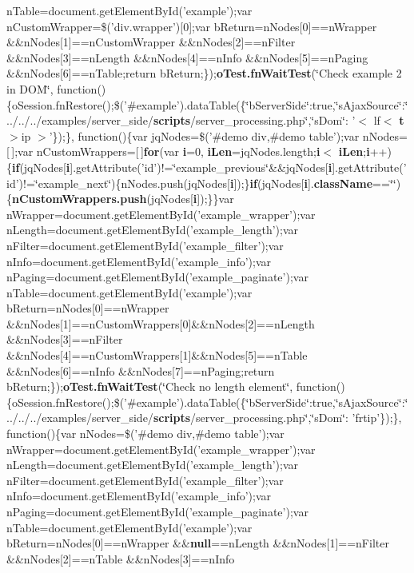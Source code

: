 {{\begin{DoxyParamCaption}
n\+Table=document.\+get\+Element\+By\+Id('example');var n\+Custom\+Wrapper=\$('div.\+wrapper')\mbox{[}0\mbox{]};var b\+Return=n\+Nodes\mbox{[}0\mbox{]}==n\+Wrapper \&\&n\+Nodes\mbox{[}1\mbox{]}==n\+Custom\+Wrapper \&\&n\+Nodes\mbox{[}2\mbox{]}==n\+Filter \&\&n\+Nodes\mbox{[}3\mbox{]}==n\+Length \&\&n\+Nodes\mbox{[}4\mbox{]}==n\+Info \&\&n\+Nodes\mbox{[}5\mbox{]}==n\+Paging \&\&n\+Nodes\mbox{[}6\mbox{]}==n\+Table;return b\+Return;\});{\bf o\+Test.\+fn\+Wait\+Test}(\char`\"{}Check example 2 in D\+O\+M\char`\"{}, function()\{o\+Session.\+fn\+Restore();\$('\#example').data\+Table(\{\char`\"{}b\+Server\+Side\char`\"{}\+:true,\char`\"{}s\+Ajax\+Source\char`\"{}\+:\char`\"{}../../../examples/server\+\_\+side/{\bf scripts}/server\+\_\+processing.\+php\char`\"{},\char`\"{}s\+Dom\char`\"{}\+: '$<$ lf$<$ {\bf t} $>$ip $>$'\});\}, function()\{var jq\+Nodes=\$('\#demo div,\#demo table');var n\+Nodes=\mbox{[}$\,$\mbox{]};var n\+Custom\+Wrappers=\mbox{[}$\,$\mbox{]}{\bf for}(var {\bf i}=0, {\bf i\+Len}=jq\+Nodes.\+length;{\bf i}$<$ {\bf i\+Len};{\bf i}++)\{{\bf if}(jq\+Nodes\mbox{[}{\bf i}\mbox{]}.get\+Attribute('id')!=\char`\"{}example\+\_\+previous\char`\"{}\&\&jq\+Nodes\mbox{[}{\bf i}\mbox{]}.get\+Attribute('id')!=\char`\"{}example\+\_\+next\char`\"{})\{n\+Nodes.\+push(jq\+Nodes\mbox{[}{\bf i}\mbox{]});\}{\bf if}(jq\+Nodes\mbox{[}{\bf i}\mbox{]}.{\bf class\+Name}==\char`\"{}\char`\"{})\{{\bf n\+Custom\+Wrappers.\+push}(jq\+Nodes\mbox{[}{\bf i}\mbox{]});\}\}var n\+Wrapper=document.\+get\+Element\+By\+Id('example\+\_\+wrapper');var n\+Length=document.\+get\+Element\+By\+Id('example\+\_\+length');var n\+Filter=document.\+get\+Element\+By\+Id('example\+\_\+filter');var n\+Info=document.\+get\+Element\+By\+Id('example\+\_\+info');var n\+Paging=document.\+get\+Element\+By\+Id('example\+\_\+paginate');var n\+Table=document.\+get\+Element\+By\+Id('example');var b\+Return=n\+Nodes\mbox{[}0\mbox{]}==n\+Wrapper \&\&n\+Nodes\mbox{[}1\mbox{]}==n\+Custom\+Wrappers\mbox{[}0\mbox{]}\&\&n\+Nodes\mbox{[}2\mbox{]}==n\+Length \&\&n\+Nodes\mbox{[}3\mbox{]}==n\+Filter \&\&n\+Nodes\mbox{[}4\mbox{]}==n\+Custom\+Wrappers\mbox{[}1\mbox{]}\&\&n\+Nodes\mbox{[}5\mbox{]}==n\+Table \&\&n\+Nodes\mbox{[}6\mbox{]}==n\+Info \&\&n\+Nodes\mbox{[}7\mbox{]}==n\+Paging;return b\+Return;\});{\bf o\+Test.\+fn\+Wait\+Test}(\char`\"{}Check no length element\char`\"{}, function()\{o\+Session.\+fn\+Restore();\$('\#example').data\+Table(\{\char`\"{}b\+Server\+Side\char`\"{}\+:true,\char`\"{}s\+Ajax\+Source\char`\"{}\+:\char`\"{}../../../examples/server\+\_\+side/{\bf scripts}/server\+\_\+processing.\+php\char`\"{},\char`\"{}s\+Dom\char`\"{}\+: 'frtip'\});\}, function()\{var n\+Nodes=\$('\#demo div,\#demo table');var n\+Wrapper=document.\+get\+Element\+By\+Id('example\+\_\+wrapper');var n\+Length=document.\+get\+Element\+By\+Id('example\+\_\+length');var n\+Filter=document.\+get\+Element\+By\+Id('example\+\_\+filter');var n\+Info=document.\+get\+Element\+By\+Id('example\+\_\+info');var n\+Paging=document.\+get\+Element\+By\+Id('example\+\_\+paginate');var n\+Table=document.\+get\+Element\+By\+Id('example');var b\+Return=n\+Nodes\mbox{[}0\mbox{]}==n\+Wrapper \&\&{\bf null}==n\+Length \&\&n\+Nodes\mbox{[}1\mbox{]}==n\+Filter \&\&n\+Nodes\mbox{[}2\mbox{]}==n\+Table \&\&n\+Nodes\mbox{[}3\mbox{]}==n\+Info 
\end{DoxyParamCaption}}}
